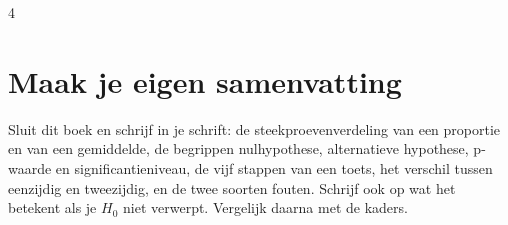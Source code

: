 \begin{oefeningen}
\begin{alleenvoor}{4}
\end{alleenvoor}

\end{oefeningen}


\begin{oefeningen}






\end{oefeningen}


\ifzelfstudie
\section*{Maak je eigen samenvatting}
Sluit dit boek en schrijf in je schrift: de steekproevenverdeling van een proportie en van een gemiddelde, de begrippen nulhypothese, alternatieve hypothese, p-waarde en significantieniveau, de vijf stappen van een toets, het verschil tussen eenzijdig en tweezijdig, en de twee soorten fouten. Schrijf ook op wat het betekent als je $H_0$ niet verwerpt. Vergelijk daarna met de kaders.
\fi
